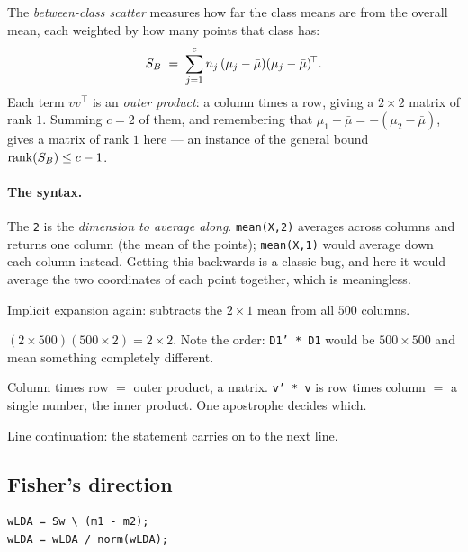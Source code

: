 The \emph{between-class scatter} measures how far the class means are from the
overall mean, each weighted by how many points that class has:
\[
  S_B \;=\; \sum_{j=1}^{c} n_j\,(\mu_j - \bar{\mu})(\mu_j - \bar{\mu})^{\!\top}.
\]
Each term $vv^{\!\top}$ is an \emph{outer product}: a column times a row,
giving a $2\times2$ matrix of rank $1$. Summing $c=2$ of them, and remembering
that $\mu_1 - \bar\mu = -(\mu_2 - \bar\mu)$, gives a matrix of rank $1$ here ---
an instance of the general bound $\operatorname{rank}(S_B) \le c-1$.

\paragraph{The syntax.}
\begin{description}[leftmargin=*,style=nextline,nosep]
\item[\texttt{mean(X,2)}] The \texttt{2} is the \emph{dimension to average
  along}. \texttt{mean(X,2)} averages across columns and returns one column
  (the mean of the points); \texttt{mean(X,1)} would average down each column
  instead. Getting this backwards is a classic bug, and here it would average
  the two coordinates of each point together, which is meaningless.
\item[\texttt{X1 - m1}] Implicit expansion again: subtracts the $2\times1$ mean
  from all $500$ columns.
\item[\texttt{D1 * D1'}] $(2\times500)(500\times2) = 2\times2$. Note the order:
  \texttt{D1' * D1} would be $500\times500$ and mean something completely
  different.
\item[\texttt{v * v'}] Column times row $=$ outer product, a matrix.
  \texttt{v' * v} is row times column $=$ a single number, the inner product.
  One apostrophe decides which.
\item[\texttt{\ldots} (three dots)] Line continuation: the statement carries on
  to the next line.
\end{description}

\subsection{Fisher's direction}

\begin{lstlisting}
wLDA = Sw \ (m1 - m2);
wLDA = wLDA / norm(wLDA);
\end{lstlisting}

